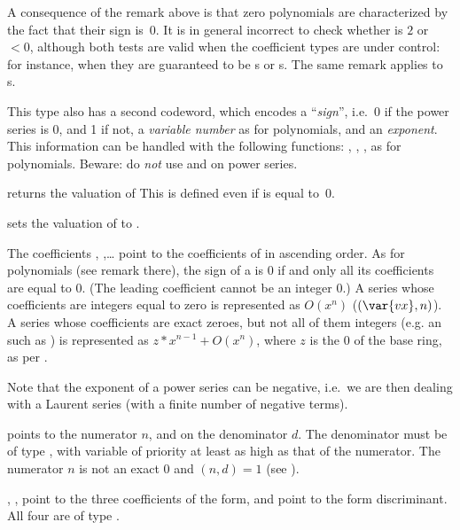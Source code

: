  A consequence of the remark above is that zero polynomials
are characterized by the fact that their sign is~0. It is in general
incorrect to check whether  is $2$ or  $< 0$,
although both tests are valid when the coefficient types are under control:
for instance, when they are guaranteed to be s or s.
The same remark applies to s.

This type also has a second codeword, which
encodes a ``\emph{sign}'', i.e.~0 if the power series is 0, and 1 if not, a
\emph{variable number} as for polynomials, and an \emph{exponent}. This
information can be handled with the following functions: ,
, ,  as for polynomials.
Beware: do \emph{not} use  and  on power series.

 returns the valuation of 
This is defined even if  is equal to~0.

 sets the valuation of 
to .

The coefficients , ,\dots {} point to
the coefficients of  in ascending order. As for polynomials
(see remark there), the sign of a  is $0$ if and only all
its coefficients are equal to $0$. (The leading coefficient cannot be an
integer $0$.) A series whose coefficients are integers equal to zero
is represented as $O(x^n)$ ($(\var{vx},n)$).
A series whose coefficients are exact zeroes, but not all of
them integers  (e.g. an  such as ) is
represented as $z*x^{n-1} +O(x^n)$, where $z$ is the $0$ of the
base ring, as per .

Note that the exponent of a power series can be negative, i.e.~we are
then dealing with a Laurent series (with a finite number of negative
terms).

%
  points to the
numerator $n$, and  on the denominator $d$. The denominator must be
of type , with variable of priority at least as high as that of the
numerator. The numerator $n$ is not an exact $0$ and $(n,d) = 1$ (see
).

%
 , ,
 point to the three coefficients of the form, and  point to
the form discriminant. All four are of type .

